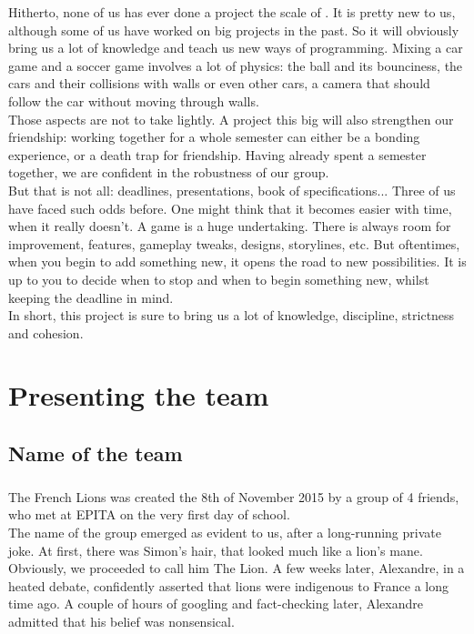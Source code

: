 Hitherto, none of us has ever done a project the scale of \FR. It is pretty new to us, although some of us have worked on big projects in the past. So it will obviously bring us a lot of knowledge and teach us new ways of programming. Mixing a car game and a soccer game involves a lot of physics: the ball and its bounciness, the cars and their collisions with walls or even other cars, a camera that should follow the car without moving through walls.\\


Those aspects are not to take lightly. A project this big will also strengthen our friendship: working together for a whole semester can either be a bonding experience, or a death trap for friendship. Having already spent a semester together, we are confident in the robustness of our group.\\


But that is not all: deadlines, presentations, book of specifications... Three of us have faced such odds before. One might think that it becomes easier with time, when it really doesn’t. A game is a huge undertaking. There is always room for improvement, features, gameplay tweaks, designs, storylines, etc. But oftentimes, when you begin to add something new, it opens the road to new possibilities. It is up to you to decide when to stop and when to begin something new, whilst keeping the deadline in mind.\\

In short, this project is sure to bring us a lot of knowledge, discipline, strictness and cohesion.

\chapter{Presenting the team}

\section{Name of the team}

\paragraph{}The French Lions was created the 8th of November 2015 by a group of 4 friends, who met at EPITA on the very first day of school.\\

The name of the group emerged as evident to us, after a long-running private joke. At first, there was Simon’s hair, that looked much like a lion’s mane. Obviously, we proceeded to call him The Lion. A few weeks later, Alexandre, in a heated debate, confidently asserted that lions were indigenous to France a long time ago. A couple of hours of googling and fact-checking later, Alexandre admitted that his belief was nonsensical.\\

